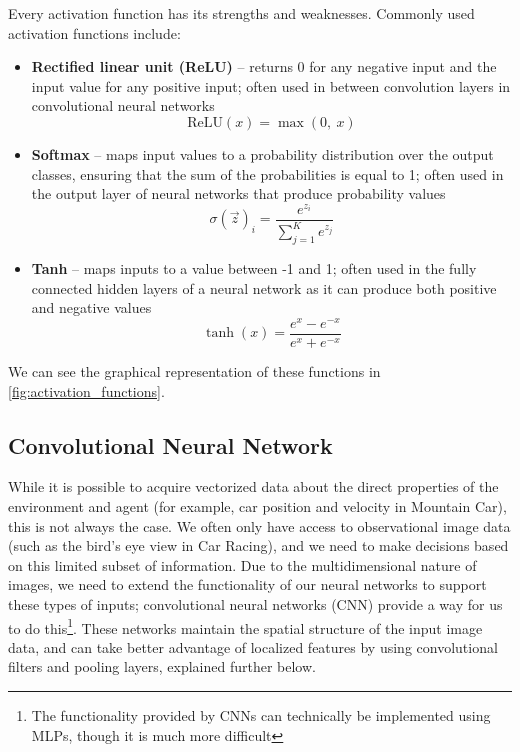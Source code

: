 Every activation function has its strengths and weaknesses. Commonly used
activation functions include:

\begin{itemize}
  \item \textbf{Rectified linear unit (ReLU)} -- returns 0 for any negative input and the input value for any positive input; often used in between convolution layers in convolutional neural networks
        $$\text{ReLU}(x) = \max(0,~x)$$
  \item \textbf{Softmax} -- maps input values to a probability distribution over the output classes, ensuring that the sum of the probabilities is equal to 1; often used in the output layer of neural networks that produce probability values
        $$\sigma(\vec{z})_i = \frac{e^{z_i}}{\sum_{j=1}^K e^{z_j}}$$
  \item \textbf{Tanh} --  maps inputs to a value between -1 and 1; often used in the fully connected hidden layers of a neural network as it can produce both positive and negative values
        $$\tanh(x) = \frac{e^x - e^{-x}}{e^x + e^{-x}}$$
\end{itemize}

We can see the graphical representation of these functions in
\autoref{fig:activation_functions}.



\subsection{Convolutional Neural Network}

While it is possible to acquire vectorized data about the direct properties of
the environment and agent (for example, car position and velocity in Mountain
Car), this is not always the case. We often only have access to observational
image data (such as the bird's eye view in Car Racing), and we need to make
decisions based on this limited subset of information. Due to the
multidimensional nature of images, we need to extend the functionality of our
neural networks to support these types of inputs; convolutional neural networks
(CNN) provide a way for us to do this\footnote{The functionality provided by
  CNNs can technically be implemented using MLPs, though it is much more
  difficult}. These networks maintain the spatial structure of the input image
data, and can take better advantage of localized features by using
convolutional filters and pooling layers, explained further below.

